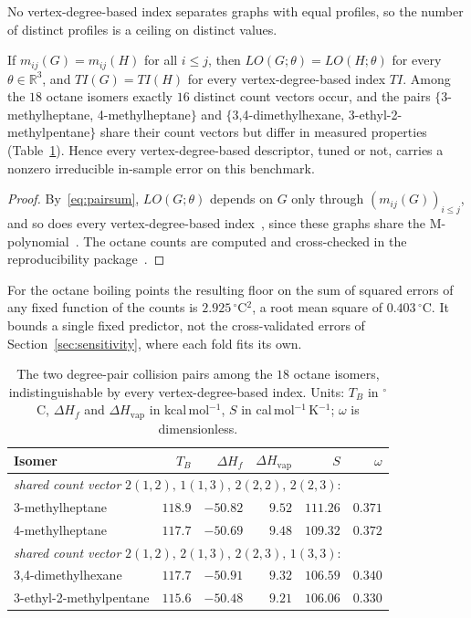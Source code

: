 No vertex-degree-based index separates graphs with equal profiles, so the
number of distinct profiles is a ceiling on distinct values.

  \begin{proposition}\label{prop:collision}
  If $m_{ij}(G) = m_{ij}(H)$ for all $i \le j$, then
  $LO(G;\theta) = LO(H;\theta)$ for every $\theta \in \mathbb{R}^3$, and
  $TI(G) = TI(H)$ for every vertex-degree-based index $TI$. Among the
  $18$ octane isomers exactly $16$ distinct count vectors occur, and the
  pairs $\{$3-methylheptane, 4-methylheptane$\}$ and
  $\{$3,4-dimethylhexane, 3-ethyl-2-methylpentane$\}$ share their
  count vectors but differ in measured properties
  (Table~\ref{tab:collisions}). Hence every vertex-degree-based
  descriptor, tuned or not, carries a nonzero irreducible in-sample error on this benchmark.
  \end{proposition}

  \begin{proof}
  By~\eqref{eq:pairsum}, $LO(G;\theta)$ depends on $G$ only through
  $(m_{ij}(G))_{i \le j}$, and so does every vertex-degree-based
  index~\cite{Rada2026LinearVDB}, since these graphs share the
  M-polynomial~\cite{DeutschKlavzar2015}. The octane counts are computed
  and cross-checked in the reproducibility package~\cite{LoyolaRepo}.
  \end{proof}

For the octane boiling points the resulting floor on the sum of squared
errors of any fixed function of the counts is $2.925\,^{\circ}$C$^2$, a
root mean square of $0.403\,^{\circ}$C. It bounds a single fixed
predictor, not the cross-validated errors of Section~\ref{sec:sensitivity},
where each fold fits its own.

\begin{table}[htbp]
\centering
\caption{The two degree-pair collision pairs among the $18$ octane
isomers, indistinguishable by every vertex-degree-based index. Units:
$T_B$ in $^{\circ}$C, $\Delta H_f$ and $\Delta H_{\mathrm{vap}}$ in
kcal\,mol$^{-1}$, $S$ in cal\,mol$^{-1}$\,K$^{-1}$; $\omega$ is
dimensionless.}
\label{tab:collisions}
\small
\begin{tabular}{lrrrrr}
\toprule
Isomer & $T_B$ & $\Delta H_f$ & $\Delta H_{\mathrm{vap}}$ & $S$ & $\omega$\\
\midrule
\multicolumn{6}{l}{\emph{shared count vector} $2(1,2),\,1(1,3),\,2(2,2),\,2(2,3)$:}\\
3-methylheptane & $118.9$ & $-50.82$ & $9.52$ & $111.26$ & $0.371$\\
4-methylheptane & $117.7$ & $-50.69$ & $9.48$ & $109.32$ & $0.372$\\
\midrule
\multicolumn{6}{l}{\emph{shared count vector} $2(1,2),\,2(1,3),\,2(2,3),\,1(3,3)$:}\\
3,4-dimethylhexane & $117.7$ & $-50.91$ & $9.32$ & $106.59$ & $0.340$\\
3-ethyl-2-methylpentane & $115.6$ & $-50.48$ & $9.21$ & $106.06$ & $0.330$\\
\bottomrule
\end{tabular}
\end{table}

